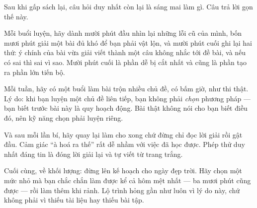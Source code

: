 \documentclass[../../algorithm.tex]{subfiles}
\begin{document}
\begin{dongian}
Sau khi gấp sách lại, câu hỏi duy nhất còn lại là sáng mai làm gì. Câu trả lời gọn thế này.

Mỗi buổi luyện, hãy dành mười phút đầu nhìn lại những lỗi cũ của mình, bốn mươi phút giải một bài đủ khó để bạn phải vật lộn, và mười phút cuối ghi lại hai thứ: ý chính của bài vừa giải viết thành một câu không nhắc tới đề bài, và nếu có sai thì sai vì sao. Mười phút cuối là phần dễ bị cắt nhất và cũng là phần tạo ra phần lớn tiến bộ.

Mỗi tuần, hãy có một buổi làm bài trộn nhiều chủ đề, có bấm giờ, như thi thật. Lý do: khi bạn luyện một chủ đề liên tiếp, bạn không phải \emph{chọn} phương pháp --- bạn biết trước bài này là quy hoạch động. Bài thật không nói cho bạn biết điều đó, nên kỹ năng chọn phải luyện riêng.

Và sau mỗi lần bí, hãy quay lại làm cho xong chứ đừng chỉ đọc lời giải rồi gật đầu. Cảm giác ``à hoá ra thế'' rất dễ nhầm với việc đã học được. Phép thử duy nhất đáng tin là đóng lời giải lại và tự viết từ trang trắng.

Cuối cùng, về khối lượng: đừng lên kế hoạch cho ngày đẹp trời. Hãy chọn một mức nhỏ mà bạn chắc chắn làm được kể cả hôm mệt nhất --- ba mươi phút cũng được --- rồi làm thêm khi rảnh. Lộ trình hỏng gần như luôn vì lý do này, chứ không phải vì thiếu tài liệu hay thiếu bài tập.
\end{dongian}
\end{document}
